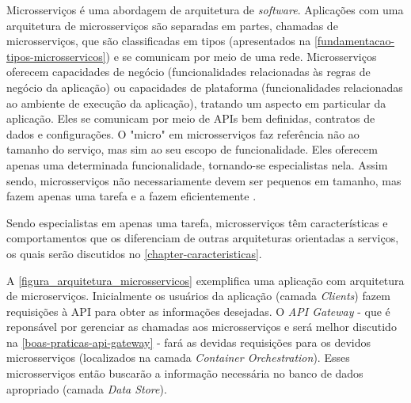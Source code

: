 Microsserviços é uma abordagem de arquitetura de \emph{software}. Aplicações com uma arquitetura de microsserviços são separadas em partes, chamadas de microsserviços, que são classificadas em tipos (apresentados na \autoref{fundamentacao-tipos-microsservicos}) e se comunicam por meio de uma rede. Microsserviços oferecem capacidades de negócio (funcionalidades relacionadas às regras de negócio da aplicação) ou capacidades de plataforma (funcionalidades relacionadas ao ambiente de execução da aplicação), tratando um aspecto em particular da aplicação. Eles se comunicam por meio de APIs bem definidas, contratos de dados e configurações. O "micro" em microsserviços faz referência não ao tamanho do serviço, mas sim ao seu escopo de funcionalidade. Eles oferecem apenas uma determinada funcionalidade, tornando-se especialistas nela. Assim sendo, microsserviços não necessariamente devem ser pequenos em tamanho, mas fazem apenas uma tarefa e a fazem eficientemente \cite{Familiar2015}.
 
Sendo especialistas em apenas uma tarefa, microsserviços têm características e comportamentos que os diferenciam de outras arquiteturas orientadas a serviços, os quais serão discutidos no \autoref{chapter-caracteristicas}.

A \autoref{figura_arquitetura_microsservicos} exemplifica uma aplicação com arquitetura de microserviços. Inicialmente os usuários da aplicação (camada \emph{Clients}) fazem requisições à API para obter as informações desejadas. O \emph{API Gateway} - que é reponsável por gerenciar as chamadas aos microsserviços e será melhor discutido na \autoref{boas-praticas-api-gateway} - fará as devidas requisições para os devidos microsserviços (localizados na camada \emph{Container Orchestration}). Esses microsserviços então buscarão a informação necessária no banco de dados apropriado (camada \emph{Data Store}).



